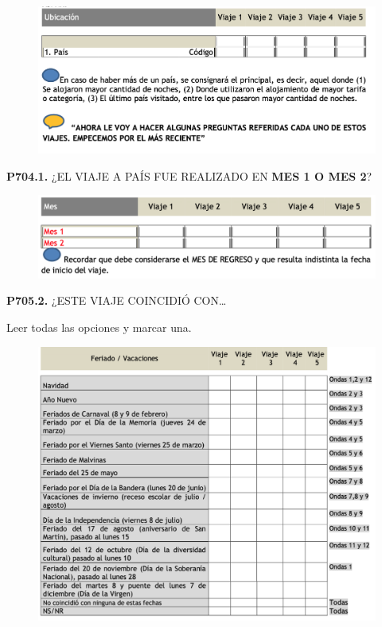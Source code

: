\documentclass[
  openany]{book}
\begin{document}
\begin{figure}

{\centering \includegraphics[width=1\linewidth]{imagenes/figura6-237} 

}

\end{figure}

\textbf{P704.1.} ¿EL VIAJE A PAÍS FUE REALIZADO EN \textbf{MES 1 O MES 2}?

\begin{figure}

{\centering \includegraphics[width=1\linewidth]{imagenes/figura6-238} 

}

\end{figure}

\textbf{P705.2.} ¿ESTE VIAJE COINCIDIÓ CON\ldots{}

Leer todas las opciones y marcar una.

\begin{figure}

{\centering \includegraphics[width=1\linewidth]{imagenes/figura6-239} 

}

\end{figure}
\end{document}
